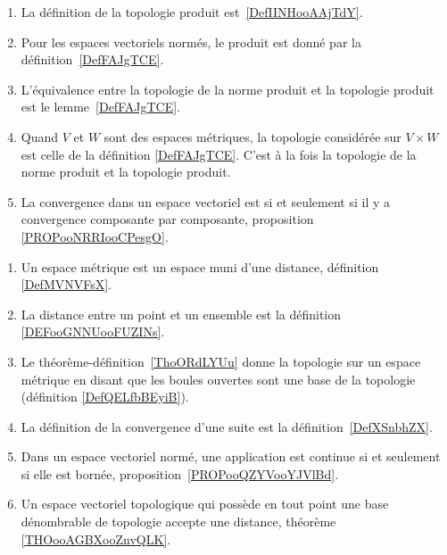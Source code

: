        \label{THEMEooYRIWooDXZnhX}
    \begin{enumerate}
        \item
            La définition de la topologie produit est~\ref{DefIINHooAAjTdY}.
        \item
            Pour les espaces vectoriels normés, le produit est donné par la définition~\ref{DefFAJgTCE}.
        \item
            L'équivalence entre la topologie de la norme produit et la topologie produit est le lemme~\ref{DefFAJgTCE}.
        \item
            Quand \( V\) et \( W\) sont des espaces métriques, la topologie considérée sur \( V\times W\) est celle de la définition \ref{DefFAJgTCE}. C'est à la fois la topologie de la norme produit et la topologie produit.
        \item
            La convergence dans un espace vectoriel est si et seulement si il y a convergence composante par composante, proposition \ref{PROPooNRRIooCPesgO}.
        \end{enumerate}

\begin{enumerate}
    \item
        Un espace métrique est un espace muni d'une distance, définition \ref{DefMVNVFsX}.
    \item
        La distance entre un point et un ensemble est la définition \ref{DEFooGNNUooFUZINs}.
    \item
        Le théorème-définition~\ref{ThoORdLYUu} donne la topologie sur un espace métrique en disant que les boules ouvertes sont une base de la topologie (définition \ref{DefQELfbBEyiB}).
    \item
        La définition de la convergence d'une suite est la définition~\ref{DefXSnbhZX}.
    \item
        Dans un espace vectoriel normé, une application est continue si et seulement si elle est bornée, proposition~\ref{PROPooQZYVooYJVlBd}.
    \item
        Un espace vectoriel topologique qui possède en tout point une base dénombrable de topologie accepte une distance, théorème \ref{THOooAGBXooZnvQLK}.
\end{enumerate}


